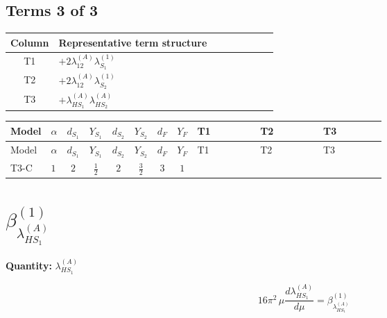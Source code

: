 \documentclass[8pt]{article}
\begin{document}
\begin{landscape}
\subsection*{Terms 3 of 3}
\begin{center}
\begin{tabular}{@{}c >{\raggedright\arraybackslash}p{0.82\linewidth}@{}}
\toprule
Column & Representative term structure \\
\midrule
T1 & \(\displaystyle +2 {\lambda_{12}^{(A)}} {\lambda_{S_1}^{(1)}}\) \\
\midrule
T2 & \(\displaystyle +2 {\lambda_{12}^{(A)}} {\lambda_{S_2}^{(1)}}\) \\
\midrule
T3 & \(\displaystyle +{\lambda_{HS_1}^{(A)}} {\lambda_{HS_2}^{(A)}}\) \\
\midrule
\bottomrule
\end{tabular}
\end{center}
\smallskip
\tiny
\begin{longtable}{@{}llcccccc >{\raggedright\arraybackslash}p{0.21\linewidth} >{\raggedright\arraybackslash}p{0.21\linewidth} >{\raggedright\arraybackslash}p{0.21\linewidth}@{}}
\toprule
Model & $\alpha$ & $d_{S_1}$ & $Y_{S_1}$ & $d_{S_2}$ & $Y_{S_2}$ & $d_F$ & $Y_F$ & T1 & T2 & T3 \\
\midrule
\endfirsthead
\toprule
Model & $\alpha$ & $d_{S_1}$ & $Y_{S_1}$ & $d_{S_2}$ & $Y_{S_2}$ & $d_F$ & $Y_F$ & T1 & T2 & T3 \\
\midrule
\endhead
T3-C & $1$ & $2$ & $\frac{1}{2}$ & $2$ & $\frac{3}{2}$ & $3$ & $1$ & \scriptsize\adjustbox{max width=\linewidth}{$\begin{gathered} +2 {\lambda_{12}^{(A)}} {\lambda_{S_1}^{(1)}}\end{gathered}$} & \scriptsize\adjustbox{max width=\linewidth}{$\begin{gathered} +2 {\lambda_{12}^{(A)}} {\lambda_{S_2}^{(1)}}\end{gathered}$} & \scriptsize\adjustbox{max width=\linewidth}{$\begin{gathered} +{\lambda_{HS_1}^{(A)}} {\lambda_{HS_2}^{(A)}}\end{gathered}$} \\
\midrule
\bottomrule
\end{longtable}
\clearpage
\section*{$\beta_{\lambda_{HS_1}^{(A)}}^{(1)}$}
\noindent\textbf{Quantity: }$\lambda_{HS_1}^{(A)}$\par\smallskip
\[16\pi^2\,\mu\frac{d \lambda_{HS_1}^{(A)}}{d\mu}=\beta_{\lambda_{HS_1}^{(A)}}^{(1)}\]

\end{landscape}
\end{document}
